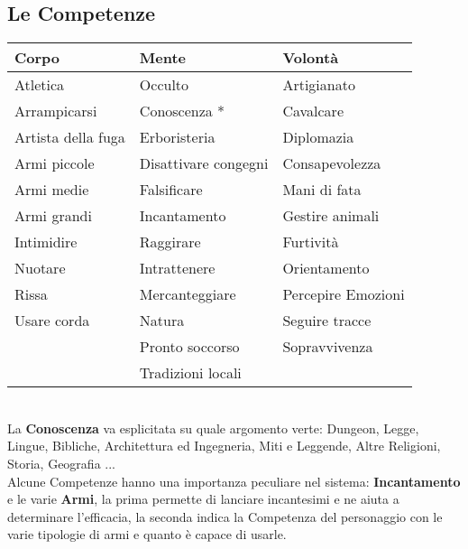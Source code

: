 \documentclass[12pt,a4paper,twoside,openany]{book}
\begin{document}
\subsection{Le Competenze}

\begin{tabular*}{0.93\linewidth}{@{\extracolsep{\fill}}lll}
\textbf{Corpo} & \textbf{Mente} & \textbf{Volontà}\\
\toprule
Atletica				& Occulto					& Artigianato			\\	
Arrampicarsi			& Conoscenza *				& Cavalcare				\\
Artista della fuga		& Erboristeria				& Diplomazia			\\
Armi piccole 			& Disattivare congegni		& Consapevolezza	\\
Armi medie 				& Falsificare				& Mani di fata\\
Armi grandi			& Incantamento				& Gestire animali\\
Intimidire		 		& Raggirare					& Furtività\\
Nuotare					& Intrattenere				& Orientamento\\
Rissa					& Mercanteggiare			& Percepire Emozioni \\ 
Usare corda		 		& Natura					& Seguire tracce\\
						& Pronto soccorso			& Sopravvivenza\\
						& Tradizioni locali			& \\

\end{tabular*}\\

La \textbf{Conoscenza} va esplicitata su quale argomento verte: Dungeon, Legge, Lingue, Bibliche, Architettura ed Ingegneria, Miti e Leggende, Altre Religioni, Storia, Geografia ...\\

Alcune Competenze hanno una importanza peculiare nel sistema: \textbf{Incantamento} e le varie \textbf{Armi}, la prima permette di lanciare incantesimi e ne aiuta a determinare l'efficacia, la seconda indica la Competenza del personaggio con le varie tipologie di armi e quanto è capace di usarle.
\end{document}
